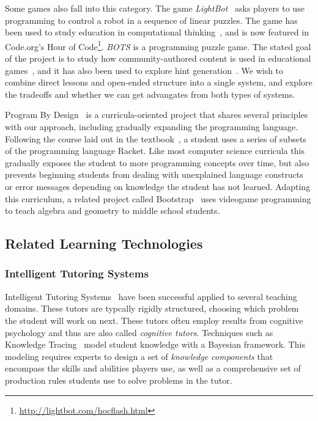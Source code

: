 \documentclass{sig-alternate}
\begin{document}
Some games also fall into this category.
The game \emph{LightBot}~\cite{lightbot} asks players to use programming to control a robot in a sequence of linear puzzles.
The game has been used to study education in computational thinking~\cite{Gouws13Lightbot}, and is now featured in Code.org's Hour of Code\footnote{\url{http://lightbot.com/hocflash.html}}.
\emph{BOTS} is a programming puzzle game. The stated goal of the project is to study how community-authored content is used in educational games~\cite{hickspart14}, and it has also been used to explore hint generation~\cite{peddycord14generating}.
We wish to combine direct lessons and open-ended structure into a single system, and explore the tradeoffs and whether we can get advangates from both types of systems.

Program By Design~\cite{programbydesign} is a curricula-oriented project that shares several principles with our approach, including gradually expanding the programming language. 
Following the course laid out in the textbook~\cite{felleisen2001design}, a student uses a series of subsets of the programming language Racket.
Like most computer science curricula this gradually exposes the student to more programming concepts over time, but also prevents beginning students from dealing with unexplained language constructs or error messages depending on knowledge the student has not learned.
Adapting this curriculum, a related project called Bootstrap~\cite{bootstrap} uses videogame programming to teach algebra and geometry to middle school students.



\subsection{Related Learning Technologies}

\subsubsection{Intelligent Tutoring Systems}
Intelligent Tutoring Systems~\cite{koedinger06cognitive} have been successful applied to several teaching domains.
These tutors are typcally rigidly structured, choosing which problem the student will work on next.
These tutors often employ results from cognitive psychology and thus are also called \emph{cognitive tutors}.
Techniques such as Knowledge Tracing~\cite{corbett1994knowledge} model student knowledge with a Bayesian framework.
This modeling requires experts to design a set of \emph{knowledge components} that encompass the skills and abilities players use, as well as a comprehensive set of production rules students use to solve problems in the tutor.
\end{document}
